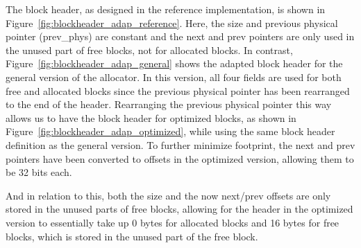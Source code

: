 The block header, as designed in the reference implementation, is shown in Figure~\ref{fig:blockheader_adap_reference}. Here, the size and previous physical pointer (prev\_phys) are constant and the next and prev pointers are only used in the unused part of free blocks, not for allocated blocks. In contrast, Figure~\ref{fig:blockheader_adap_general} shows the adapted block header for the general version of the allocator. In this version, all four fields are used for both free and allocated blocks since the previous physical pointer has been rearranged to the end of the header. Rearranging the previous physical pointer this way allows us to have the block header for optimized blocks, as shown in Figure~\ref{fig:blockheader_adap_optimized}, while using the same block header definition as the general version. To further minimize footprint, the next and prev pointers have been converted to offsets in the optimized version, allowing them to be 32 bits each. 


And in relation to this, both the size and the now next/prev offsets are only stored in the unused parts of free blocks, allowing for the header in the optimized version to essentially take up 0 bytes for allocated blocks and 16 bytes for free blocks, which is stored in the unused part of the free block.


